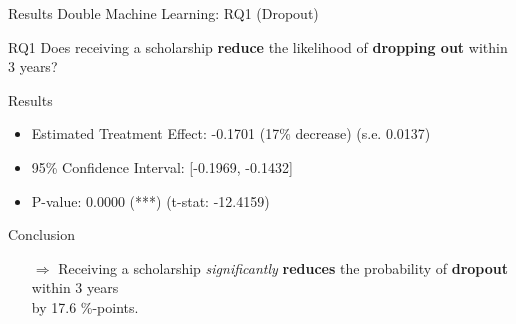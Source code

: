 \documentclass[aspectratio=169]{beamer}
\begin{document}
\begin{frame}{Results Double Machine Learning: RQ1 (Dropout)}
\vspace{20pt}
    \begin{alertblock}{RQ1}
	Does receiving a scholarship \textbf{reduce} the likelihood of \textbf{dropping out} within 3 years?
	\end{alertblock}

\begin{block}{Results}
\begin{itemize}[label=--,itemsep=1pt,topsep=2pt]
	\item Estimated Treatment Effect: -0.1701 (17\% decrease) (s.e. 0.0137)
	\item 95\% Confidence Interval: [-0.1969, -0.1432]
	\item P-value: 0.0000 (***) (t-stat: -12.4159)
\end{itemize}
\end{block}

\begin{exampleblock}{Conclusion}
\vspace{-3pt}
\begin{itemize}
	\item [$\Rightarrow$]Receiving a scholarship \textit{significantly} \textbf{reduces} the probability of \textbf{dropout} within 3 years \\ by 17.6 \%-points. 
\end{itemize}
\vspace{-3pt}
\end{exampleblock}

\end{frame}
\end{document}
